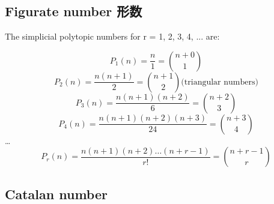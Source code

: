 \subsection{Figurate number 形数}
The simplicial polytopic numbers for r = 1, 2, 3, 4, ... are:\cite{comb4}

\begin{equation}
P_1(n) = \frac{n}{1} = {{n+0}\choose{1}}
\end{equation}
\begin{equation}
P_2(n) = \frac{n(n+1)}{2} = {{n+1}\choose{2}} \mbox{(triangular numbers)}
\end{equation}
\begin{equation}
P_3(n) = \frac{n(n+1)(n+2)}{6} = {{n+2}\choose{3}}
\end{equation}
\begin{equation}
P_4(n) = \frac{n(n+1)(n+2)(n+3)}{24} = {{n+3}\choose{4}}
\end{equation}
\ldots
\begin{equation}
P_r(n) = \frac{n(n+1)(n+2)\ldots(n+r-1)}{r!} = {{n+r-1}\choose{r}}
\end{equation}

\subsection{Catalan number}

